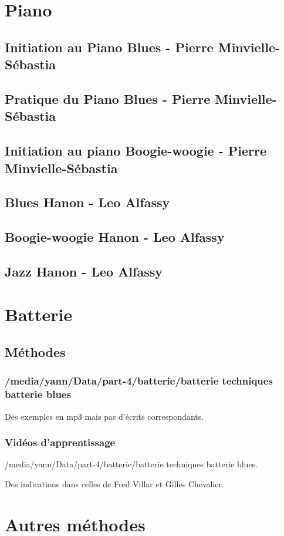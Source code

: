 \documentclass[a4paper]{book}
\begin{document}
\clearpage\chapter[Piano]{Piano}
\section{Initiation au Piano Blues - Pierre Minvielle-S\'ebastia}
\section{Pratique du Piano Blues - Pierre Minvielle-S\'ebastia}
\section{Initiation au piano Boogie-woogie - Pierre Minvielle-S\'ebastia}
\section{Blues Hanon - Leo Alfassy}
\section{Boogie-woogie Hanon - Leo Alfassy}
\section{Jazz Hanon - Leo Alfassy}

\clearpage\chapter{Batterie}
\clearpage\section{Méthodes}
\subsection{/media/yann/Data/part-4/batterie/batterie techniques batterie blues}
Des exemples en mp3 mais pas d'écrits correspondants.
\subsection{Vidéos d'apprentissage}
/media/yann/Data/part-4/batterie/batterie techniques batterie blues.

Des indications dans celles de Fred Villar et Gilles Chevalier.

\clearpage\chapter{Autres méthodes}
\end{document}
